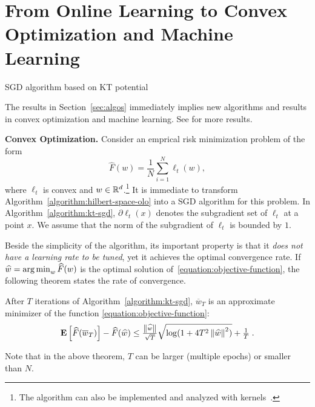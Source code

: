\section{From Online Learning to Convex Optimization and Machine Learning}
\label{section:applications}

\begin{algorithm}[t]
\caption{SGD algorithm based on KT potential \label{algorithm:kt-sgd}}
\begin{algorithmic}[1]
{
\ENDFOR
{}
}
\end{algorithmic}
\end{algorithm}

The results in Section~\ref{sec:algos} immediately implies new algorithms and
results in convex optimization and machine learning. See \cite{Orabona-2014} for more results.

\textbf{Convex Optimization.} 
Consider an emprical risk minimization problem of the form
%
\begin{equation}
\label{equation:objective-function}
\widehat{F}(w) = \frac{1}{N} \sum_{i=1}^N \ell_t(w),
\end{equation}
%
where $\ell_t$ is convex and $w \in \mathbb{R}^d$.\footnote{The algorithm can also be
implemented and analyzed with kernels~\citep{Orabona-2014}.} It is immediate to
transform Algorithm~\ref{algorithm:hilbert-space-olo} into a \ac{SGD} algorithm
for this problem. In Algorithm~\ref{algorithm:kt-sgd}, $\partial\ell_t(x)$
denotes the subgradient set of $\ell_t$ at a point $x$.  We assume that the
norm of the subgradient of $\ell_t$ is bounded by $1$.

Beside the simplicity of the algorithm, its important property is that it
\emph{does not have a learning rate to be tuned}, yet it achieves the optimal
convergence rate. If $\widehat{w} = \operatorname*{arg\,min}_w \widehat{F}(w)$ is the optimal
solution of~\eqref{equation:objective-function}, the following theorem states
the rate of convergence.
%
\begin{theorem}
After $T$ iterations of Algorithm~\ref{algorithm:kt-sgd}, $\overline{w}_T$ is
an approximate minimizer of the function \eqref{equation:objective-function}:
\[
\operatorname*{\mathbf{E}}\left[\widehat{F}(\overline{w}_T)\right] - \widehat{F}(\widehat{w}) \leq \tfrac{\left\|{\widehat{w}}\right\|}{\sqrt{T}} \sqrt{\log(1+4 T^2 \left\|{\widehat{w}}\right\|^2)} +\tfrac{1}{T} \; .
\]
\end{theorem}
%
Note that in the above theorem, $T$ can be larger (multiple epochs) or smaller
than $N$.

